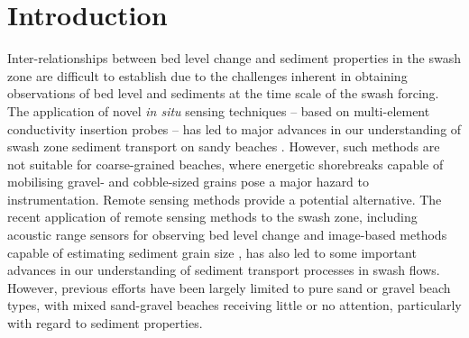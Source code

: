 \section{Introduction}


Inter-relationships between bed level change and sediment properties in the swash zone are difficult to establish due to the challenges inherent in obtaining observations of bed level and sediments at the time scale of the swash forcing. The application of novel \textit{in situ} sensing techniques -- based on multi-element conductivity insertion probes -- has led to major advances in our understanding of swash zone sediment transport on sandy beaches \citep{Puleo_etal2013, Lanckriet_etal2013}. However, such methods are not suitable for coarse-grained beaches, where energetic shorebreaks capable of mobilising gravel- and cobble-sized grains pose a major hazard to instrumentation. Remote sensing methods provide a potential alternative. The recent application of remote sensing methods to the swash zone, including acoustic range sensors for observing bed level change \citep[e.g.,][]{Turner_etal2008} and image-based methods capable of estimating sediment grain size \citep[e.g.,][]{Rubin2004, Buscombe2013}, has also led to some important advances in our understanding of sediment transport processes in swash flows. However, previous efforts have been largely limited to pure sand or gravel beach types, with mixed sand-gravel beaches receiving little or no attention, particularly with regard to sediment properties.



